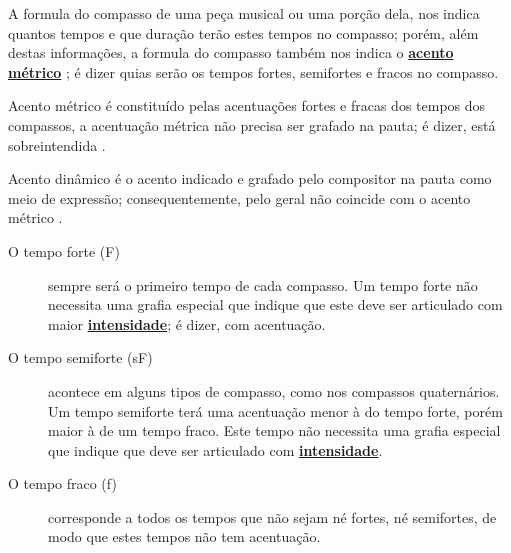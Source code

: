 A formula do compasso de uma peça musical ou uma porção dela, 
nos indica quantos tempos e que duração terão estes tempos no compasso; 
porém, além destas informações, 
a formula do compasso também nos indica o \hyperref[def:acentometrico]{\textbf{acento métrico}} \cite[pp. 70]{cardoso1973curso}; 
é dizer quias serão os tempos fortes, semifortes e fracos no compasso.

\begin{tcbinformation}{Acento métrico}
\label{def:acentometrico} 
é constituído pelas acentuações fortes e fracas dos tempos dos compassos, 
a acentuação métrica não precisa ser grafado na pauta;
é dizer, está sobreintendida \cite[pp. 141,217]{medteoria}.
\end{tcbinformation} 

\begin{tcbinformation}{Acento dinâmico}
\label{def:acentodinamico}
 é o acento indicado e grafado pelo compositor na pauta como meio de expressão;
consequentemente, pelo geral não coincide com o acento métrico \cite[pp. 217]{medteoria}.
\end{tcbinformation} 



\begin{description}

\item[O tempo forte (F)] 
\label{def:tempoforte} 
sempre será o primeiro tempo de cada compasso. 
Um tempo forte não necessita uma grafia especial que indique que este deve ser articulado
com maior \hyperref[sec:pos:Intensidade]{\textbf{intensidade}}; é dizer, com acentuação.

\item[O tempo semiforte (sF)] 
\label{def:temposemiforte} 
acontece em alguns tipos de compasso, 
como nos compassos quaternários. 
Um tempo semiforte terá uma acentuação menor à do tempo forte, porém maior à de um tempo fraco. 
Este tempo não necessita uma grafia especial que indique que deve ser articulado
com \hyperref[sec:pos:Intensidade]{\textbf{intensidade}}.

\item[O tempo fraco (f)] 
\label{def:tempofraco} 
corresponde a todos os tempos que não sejam né fortes, né semifortes,
de modo que estes tempos não tem acentuação. 
\end{description}~

